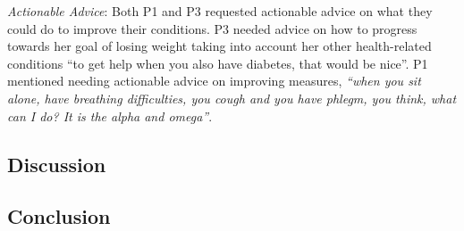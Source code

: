 \textit{Actionable Advice}: Both P1 and P3 requested actionable advice on what they could do to improve their conditions. P3 needed advice on how to progress towards her goal of losing weight taking into account her other health-related conditions “to get help when you also have diabetes, that would be nice”. P1 mentioned needing actionable advice on improving measures, \textit{“when you sit alone, have breathing difficulties, you cough and you have phlegm, you think, what can I do? It is the alpha and omega”}. 
\subsection{Discussion}


\subsection{Conclusion}

